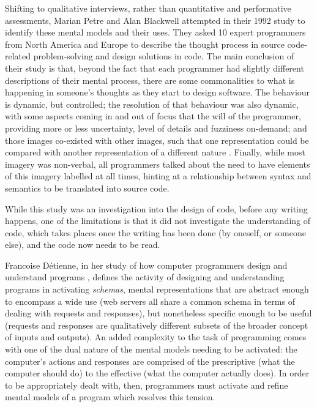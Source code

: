 Shifting to qualitative interviews, rather than quantitative and performative assessments, Marian Petre and Alan Blackwell attempted in their 1992 study to identify these mental models and their uses. They asked 10 expert programmers from North America and Europe to describe the thought process in source code-related problem-solving and design solutions in code. The main conclusion of their study is that, beyond the fact that each programmer had slightly different descriptions of their mental process, there are some commonalities to what is happening in someone's thoughts as they start to design software. The behaviour is dynamic, but controlled; the resolution of that behaviour was also dynamic, with some aspects coming in and out of focus that the will of the programmer, providing more or less uncertainty, level of details and fuzziness on-demand; and those images co-existed with other images, such that one representation could be compared with another representation of a different nature \citep{petre_glimpse_1997}. Finally, while most imagery was non-verbal, all programmers talked about the need to have elements of this imagery labelled at all times, hinting at a relationship between syntax and semantics to be translated into source code.

While this study was an investigation into the design of code, before any writing happens, one of the limitations is that it did not investigate the understanding of code, which takes places once the writing has been done (by oneself, or someone else), and the code now needs to be read. %

Francoise Détienne, in her study of how computer programmers design and understand programs \citep{detienne_software_2012}, defines the activity of designing and understanding programs in activating \emph{schemas}, mental representations that are abstract enough to encompass a wide use (web servers all share a common schema in terms of dealing with requests and responses), but nonetheless specific enough to be useful (requests and responses are qualitatively different subsets of the broader concept of inputs and outputs). An added complexity to the task of programming comes with one of the dual nature of the mental models needing to be activated: the computer's actions and responses are comprised of the prescriptive (what the computer should do) to the effective (what the computer actually does). In order to be appropriately dealt with, then, programmers must activate and refine mental models of a program which resolves this tension.

